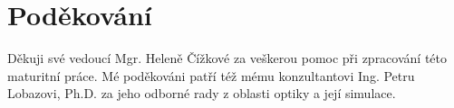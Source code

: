 \chapter*{Poděkování}

Děkuji své vedoucí Mgr. Heleně Čížkové za veškerou pomoc při zpracování této maturitní práce. Mé poděkováni patří též mému konzultantovi Ing. Petru Lobazovi, Ph.D. za jeho odborné rady z oblasti optiky a její simulace.
